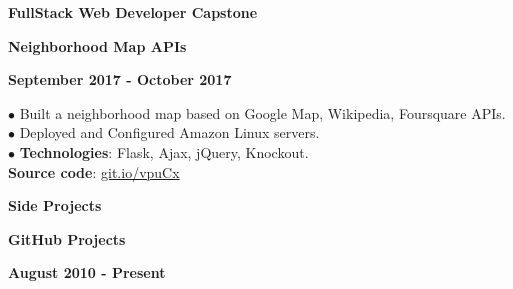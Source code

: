 \documentclass[10pt]{article}
\begin{document}
        \begin{multicols}{3}
            \begin{flushleft}
                \textbf{FullStack Web Developer Capstone}
            \end{flushleft}

            \columnbreak

            \begin{center}
                \textbf{Neighborhood Map APIs}
            \end{center}

            \columnbreak

            \begin{flushright}
                \textbf{September 2017 - October 2017}
            \end{flushright}
        \end{multicols}

        \vspace{-5mm}

        $\bullet$ {Built a neighborhood map based on Google Map, Wikipedia, Foursquare APIs.} \\
        $\bullet$ {Deployed and Configured Amazon Linux servers.} \\
        $\bullet$ {\textbf{Technologies}: Flask, Ajax, jQuery, Knockout.} \\
        \textbf{Source code}: \href{https://git.io/vpuCx}{git.io/vpuCx}


        \begin{multicols}{3}
            \begin{flushleft}
                \textbf{Side Projects}
            \end{flushleft}

            \columnbreak

            \begin{center}
                \textbf{GitHub Projects}
            \end{center}

            \columnbreak

            \begin{flushright}
                \textbf{August 2010 - Present}
            \end{flushright}
        \end{multicols}

        \vspace{-5mm}
\end{document}
